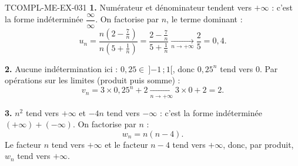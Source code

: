 \begin{corrige}{TCOMPL-ME-EX-031}
\textbf{1.} Numérateur et dénominateur tendent vers $+\infty$ : c'est la forme indéterminée $\dfrac{\infty}{\infty}$. On factorise par $n$, le terme dominant :
\[
  u_n = \frac{n\left(2-\frac{7}{n}\right)}{n\left(5+\frac{1}{n}\right)} = \frac{2-\frac{7}{n}}{5+\frac{1}{n}} \xrightarrow[n\to+\infty]{} \frac{2}{5} = 0{,}4 .
\]

\textbf{2.} Aucune indétermination ici : $0{,}25 \in\ ]{-1}\,;1[$, donc $0{,}25^n$ tend vers $0$. Par opérations sur les limites (produit puis somme) :
\[
  v_n = 3\times0{,}25^n + 2 \xrightarrow[n\to+\infty]{} 3\times0 + 2 = 2 .
\]

\textbf{3.} $n^2$ tend vers $+\infty$ et $-4n$ tend vers $-\infty$ : c'est la forme indéterminée $(+\infty)+(-\infty)$. On factorise par $n$ :
\[
  w_n = n(n-4).
\]
Le facteur $n$ tend vers $+\infty$ et le facteur $n-4$ tend vers $+\infty$, donc, par produit, $w_n$ tend vers $+\infty$.
\end{corrige}
